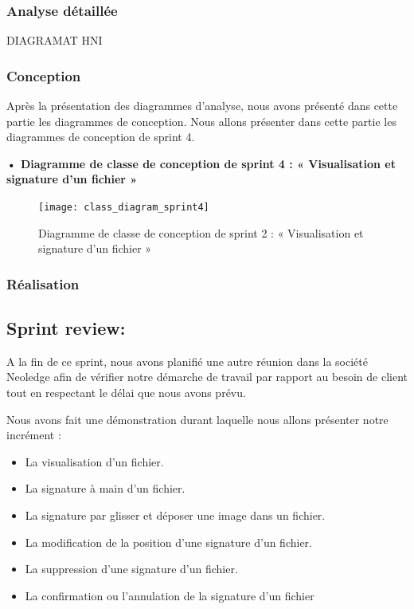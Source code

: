\subsubsection{Analyse détaillée}

DIAGRAMAT HNI 

\subsubsection{Conception}

Après la présentation des diagrammes d'analyse, nous avons présenté dans cette partie les diagrammes de conception.
Nous allons présenter dans cette partie les diagrammes de conception de sprint 4.

\textbf{•	Diagramme de classe de conception de sprint 4 : « Visualisation et signature
d'un fichier »}

\begin{figure}[H]
  \centering
  \texttt{[image: class\_diagram\_sprint4]}
  \caption{Diagramme de classe de conception de sprint 2 : « Visualisation et signature
  d'un fichier »}
  \label{fig:ClassDiagramSprint4}
\end{figure}

\subsubsection{Réalisation}

\subsection{Sprint review:}


A la fin de ce sprint, nous avons planifié une autre réunion dans la société Neoledge  afin de vérifier notre démarche de travail par rapport au besoin de client tout en respectant le délai que nous avons prévu.

Nous avons fait une démonstration durant laquelle nous allons présenter notre incrément :
\begin{itemize}
  \item La visualisation d'un fichier.
  \item La signature à main d'un fichier.
  \item La signature par glisser et déposer une image dans un fichier.
  \item La modification de la position d'une signature d'un fichier.
  \item La suppression d'une signature d'un fichier.
  \item La confirmation ou l'annulation de la signature d'un fichier
\end{itemize}

